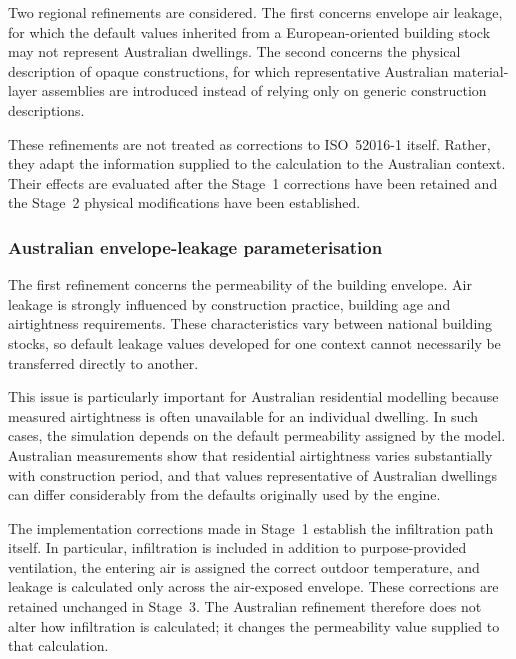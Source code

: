 \documentclass[12pt, a4paper]{article}
\begin{document}
Two regional refinements are considered. The first concerns envelope air
leakage, for which the default values inherited from a European-oriented
building stock may not represent Australian dwellings. The second concerns
the physical description of opaque constructions, for which representative
Australian material-layer assemblies are introduced instead of relying only
on generic construction descriptions.

These refinements are not treated as corrections to ISO~52016-1 itself.
Rather, they adapt the information supplied to the calculation to the
Australian context. Their effects are evaluated after the Stage~1 corrections
have been retained and the Stage~2 physical modifications have been established.

\subsubsection{Australian envelope-leakage parameterisation}

The first refinement concerns the permeability of the building envelope.
Air leakage is strongly influenced by construction practice, building age
and airtightness requirements. These characteristics vary between national
building stocks, so default leakage values developed for one context cannot
necessarily be transferred directly to another.

This issue is particularly important for Australian residential modelling
because measured airtightness is often unavailable for an individual dwelling.
In such cases, the simulation depends on the default permeability assigned by
the model. Australian measurements show that residential airtightness varies
substantially with construction period, and that values representative of
Australian dwellings can differ considerably from the defaults originally
used by the engine.

The implementation corrections made in Stage~1 establish the infiltration
path itself. In particular, infiltration is included in addition to
purpose-provided ventilation, the entering air is assigned the correct outdoor
temperature, and leakage is calculated only across the air-exposed envelope.
These corrections are retained unchanged in Stage~3. The Australian refinement
therefore does not alter how infiltration is calculated; it changes the
permeability value supplied to that calculation.
\end{document}
